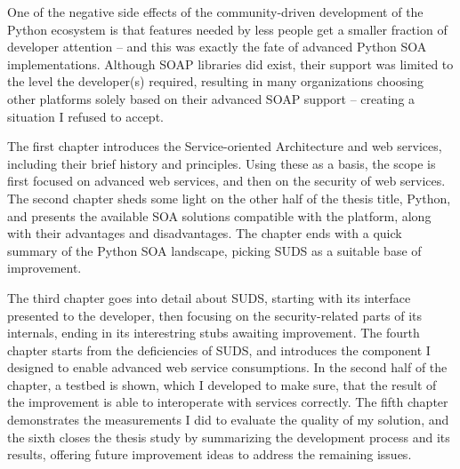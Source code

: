 One of the negative side effects of the community-driven development of the Python ecosystem is that features needed by less people get a smaller fraction of developer attention -- and this was exactly the fate of advanced Python SOA implementations. Although SOAP libraries did exist, their support was limited to the level the developer(s) required, resulting in many organizations choosing other platforms solely based on their advanced SOAP support -- creating a situation I refused to accept.

The first chapter introduces the Service-oriented Architecture and web services, including their brief history and principles. Using these as a basis, the scope is first focused on advanced web services, and then on the security of web services. The second chapter sheds some light on the other half of the thesis title, Python, and presents the available SOA solutions compatible with the platform, along with their advantages and disadvantages. The chapter ends with a quick summary of the Python SOA landscape, picking SUDS as a suitable base of improvement.

The third chapter goes into detail about SUDS, starting with its interface presented to the developer, then focusing on the security-related parts of its internals, ending in its interestring stubs awaiting improvement. The fourth chapter starts from the deficiencies of SUDS, and introduces the component I designed to enable advanced web service consumptions. In the second half of the chapter, a testbed is shown, which I developed to make sure, that the result of the improvement is able to interoperate with services correctly. The fifth chapter demonstrates the measurements I did to evaluate the quality of my solution, and the sixth closes the thesis study by summarizing the development process and its results, offering future improvement ideas to address the remaining issues.
